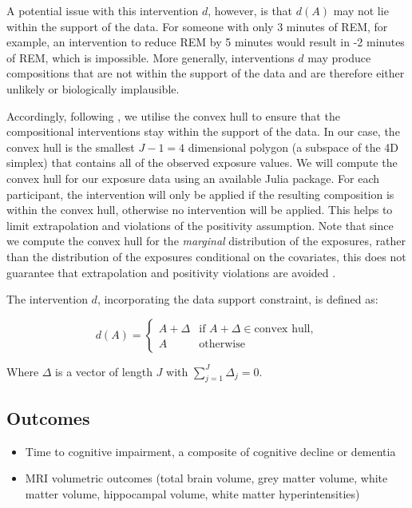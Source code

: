 \documentclass{article}
\begin{document}
A potential issue with this intervention $d$, however, is that $d(A)$ may not lie within the support of the data. For someone with only 3 minutes of REM, for example, an intervention to reduce REM by 5 minutes would result in -2 minutes of REM, which is impossible. More generally, interventions $d$ may produce compositions that are not within the support of the data and are therefore either unlikely or biologically implausible.

Accordingly, following \cite{rudolphEverythingAllOnce2025}, we utilise the convex hull to ensure that the compositional interventions stay within the support of the data. In our case, the convex hull is the smallest $J-1 = 4$ dimensional polygon (a subspace of the 4D simplex) that contains all of the observed exposure values. We will compute the convex hull for our exposure data using an available Julia package. For each participant, the intervention will only be applied if the resulting composition is within the convex hull, otherwise no intervention will be applied. This helps to limit extrapolation and violations of the positivity assumption. Note that since we compute the convex hull for the \textit{marginal} distribution of the exposures, rather than the distribution of the exposures conditional on the covariates, this does not guarantee that extrapolation and positivity violations are avoided \cite{rudolphEverythingAllOnce2025}.

The intervention $d$, incorporating the data support constraint, is defined as:

\[
    d(A) =
    \begin{cases}
        A + \Delta & \text{if } A + \Delta \in \text{convex hull}, \\
        A          & \text{otherwise}
    \end{cases}
\]

Where $\Delta$ is a vector of length $J$ with $\sum_{j=1}^{J} \Delta_j = 0$.

\subsection{Outcomes}
\begin{itemize}
    \item Time to cognitive impairment, a composite of cognitive decline or dementia
    \item MRI volumetric outcomes (total brain volume, grey matter volume, white matter volume, hippocampal volume, white matter hyperintensities)
\end{itemize}
\end{document}

